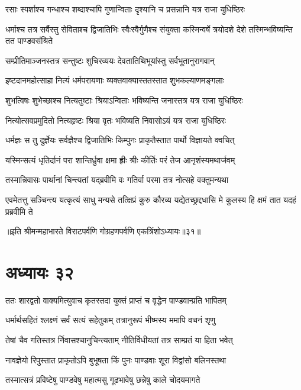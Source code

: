 \twolineshloka
{रसाः स्पर्शाश्च गन्धाश्च शब्दाश्चापि गुणान्विताः}
{दृश्यानि च प्रसन्नानि यत्र राजा युधिष्ठिरः}


\threelineshloka
{धर्माश्च तत्र सर्वैस्तु सेविताश्च द्विजातिभिः}
{स्वैःस्वैर्गुणैश्च संयुक्ता कस्मिन्वर्षे त्रयोदशे}
{देशे तस्मिन्भविष्यन्ति तत पाण्डवसंश्रिते}


\twolineshloka
{सम्प्रीतिमाञ्जनस्तत्र सन्तुष्टः शुचिरव्ययः}
{देवतातिथिभूयांस्तु सर्वभूतानुरागवान्}


\twolineshloka
{इष्टदानमहोत्साहा नित्यं धर्मपरायणाः}
{व्यक्तवाक्यास्ततस्तात शुभकल्याणमङ्गलाः}


\twolineshloka
{शुभत्विषः शुभेच्छाश्च नित्यतुष्टाः श्रियाऽन्विताः}
{भविष्यन्ति जनास्तत्र यत्र राजा युधिष्ठिरः}


\twolineshloka
{नित्योत्सवप्रमुदितो नित्यहृष्टः श्रिया वृतः}
{भविष्यति निवासोऽयं यत्र राजा युधिष्ठिरः}


\twolineshloka
{धर्मज्ञः स तु दुर्ज्ञेयः सर्वज्ञैश्च द्विजातिभिः}
{किम्पुनः प्राकृतैस्तात पार्थो विज्ञायते क्वचित्}


\twolineshloka
{यस्मिन्सत्यं धृतिर्दानं परा शान्तिर्ध्रुवा क्षमा}
{ह्रीः श्रीः कीर्तिः परं तेज आनृशंस्यमथार्जवम्}


\twolineshloka
{तस्मान्निवासः पार्थानां चिन्त्यतां यद्ब्रवीमि वः}
{गतिर्वा परमा तत्र नोत्सहे वक्तुमन्यथा}


\threelineshloka
{एवमेतत्तु सञ्चिन्त्य यत्कृत्यं साधु मन्यसे}
{तत्क्षिप्रं कुरु कौरव्य यद्येतच्छ्रद्दधासि मे}
{कुलस्य हि क्षमं तात यदहं प्रब्रवीमि ते}

॥इति श्रीमन्महाभारते विराटपर्वणि गोग्रहणपर्वणि एकत्रिंशोऽध्यायः॥३१॥

\chapter{अध्यायः ३२}

\twolineshloka
{ततः शारद्वतो वाक्यमित्युवाच कृतस्तदा}
{युक्तं प्राप्तं च वृद्धेन पाण्डवान्प्रति भापितम्}


\twolineshloka
{धर्मार्थसहितं श्लक्ष्णं सर्वं सत्यं सहेतुकम्}
{तत्रानुरूपं भीष्मस्य ममापि वचनं शृणु}


\twolineshloka
{तेषां चैव गतिस्तत्र र्निवासश्चानुचिन्त्यताम्}
{नीतिर्विधीयतां तत्र साम्प्रतं या हिता भवेत्}


\twolineshloka
{नावज्ञेयो रिपुस्तात प्राकृतोऽपि बुभूषता}
{किं पुनः पाण्डवाः शूरा विद्वांसो बलिनस्तथा}


\twolineshloka
{तस्मात्सत्रं प्रविष्टेषु पाण्डवेषु महात्मसु}
{गूढभावेषु छन्नेषु काले चोदयमागते}


